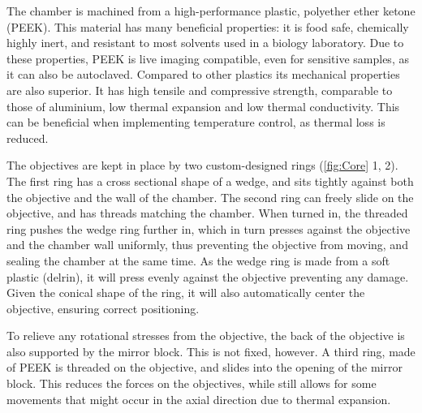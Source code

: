     The chamber is machined from a high-performance plastic, polyether ether ketone (PEEK). This material has many beneficial properties: it is food safe, chemically highly inert, and resistant to most solvents used in a biology laboratory. Due to these properties, PEEK is live imaging compatible, even for sensitive samples, as it can also be autoclaved. Compared to other plastics its mechanical properties are also superior. It has high tensile and compressive strength, comparable to those of aluminium, low thermal expansion and low thermal conductivity. This can be beneficial when implementing temperature control, as thermal loss is reduced.

    The objectives are kept in place by two custom-designed rings (\autoref{fig:Core} 1, 2). The first ring has a cross sectional shape of a wedge, and sits tightly against both the objective and the wall of the chamber. The second ring can freely slide on the objective, and has threads matching the chamber. When turned in, the threaded ring pushes the wedge ring further in, which in turn presses against the objective and the chamber wall uniformly, thus preventing the objective from moving, and sealing the chamber at the same time. As the wedge ring is made from a soft plastic (delrin), it will press evenly against the objective preventing any damage. Given the conical shape of the ring, it will also automatically center the objective, ensuring correct positioning.

    To relieve any rotational stresses from the objective, the back of the objective is also supported  by the mirror block. This is not fixed, however. A third ring, made of PEEK is threaded on the objective, and slides into the opening of the mirror block. This reduces the forces on the objectives, while still allows for some movements that might occur in the axial direction due to thermal expansion.

